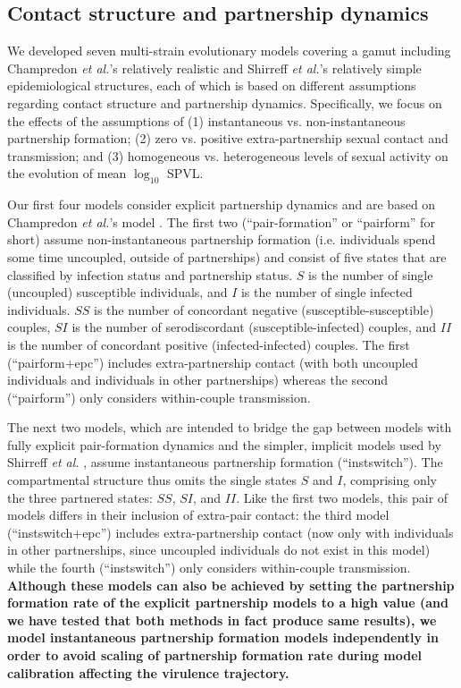 \documentclass[10pt,letterpaper]{article}
\newcommand{\Lspvl}{$\log_{10}$ SPVL}
\newcommand{\etal}{\textit{et al.}}
\newcommand{\todo}[1]{\textbf{#1}}
\begin{document}
\subsection*{Contact structure and partnership dynamics}

We developed seven multi-strain evolutionary models covering a gamut including Champredon \etal's relatively realistic \cite{champredon_hiv_2013} and Shirreff \etal's relatively simple \cite{shirreff_transmission_2011} epidemiological structures, each of which is based on different assumptions regarding contact structure and partnership dynamics. Specifically, we focus on the effects of the assumptions of (1) instantaneous vs. non-instantaneous partnership formation; (2) zero vs. positive extra-partnership sexual contact and transmission; and (3) homogeneous vs. heterogeneous levels of sexual activity on the evolution of mean \Lspvl.

Our first four models consider explicit partnership dynamics and are based on Champredon \etal's model \cite{champredon_hiv_2013}. The first two (``pair-formation'' or ``pairform'' for short) assume non-instantaneous partnership formation (i.e. individuals spend some time uncoupled, outside of partnerships) and consist of five states that are classified by infection status and partnership status. $S$ is the number of single (uncoupled) susceptible individuals, and $I$ is the number of single infected individuals. $SS$ is the number of concordant negative (susceptible-susceptible) couples, $SI$ is the number of serodiscordant (susceptible-infected) couples, and $II$ is the number of concordant positive (infected-infected) couples. The first (``pairform+epc'') includes extra-partnership contact (with both uncoupled individuals and individuals in other partnerships) whereas the second (``pairform'') only considers within-couple transmission. 

The next two models, which are intended to bridge the gap between models with fully explicit pair-formation dynamics and the simpler, implicit models used by Shirreff \emph{et al.} \cite{shirreff_transmission_2011}, assume instantaneous partnership formation (``instswitch''). The compartmental structure thus omits the single states $S$ and $I$, comprising only the three partnered states: $SS$, $SI$, and $II$. Like the first two models, this pair of models differs in their inclusion of extra-pair contact: the third model (``instswitch+epc'') includes extra-partnership contact (now only with individuals in other partnerships, since uncoupled individuals do not exist in this model) while the fourth (``instswitch'') only considers within-couple transmission. \todo{Although these models can also be achieved by setting the partnership formation rate of the explicit partnership models to a high value (and we have tested that both methods in fact produce same results), we model instantaneous partnership formation models independently in order to avoid scaling of partnership formation rate during model calibration affecting the virulence trajectory.}
\end{document}
